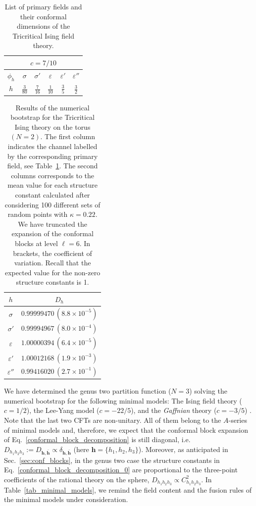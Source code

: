 \documentclass[a4paper,11pt]{article}
\begin{document}
\begin{table}[tbp]
\centering
\begin{tabular}{|c|c c c c c|}
\multicolumn{6}{c}{$c=7/10$}\\
\hline 
$\phi_h$ & $\sigma$ & $\sigma'$ & $\varepsilon$ & $\varepsilon'$ & $\varepsilon''$\\
\hline 
$h$ & $\frac{3}{80}$ & $\frac{7}{16}$ & $\frac{1}{10}$ & $\frac{3}{5}$ & $\frac{3}{2}$\\
\hline
\end{tabular}
\caption{\label{tab_tric} List of primary fields and their conformal dimensions of the 
Tricritical Ising field theory.}
\end{table}

\begin{table}[tbp]
\centering
\begin{tabular}{|c|c|}
\hline 
  $h$ &  $D_{h}$ \\ 
 \hline
 $\sigma$        &  $0.99999470\,(8.8\times 10^{-5})$  \\
 $\sigma'$       &  $0.99994967\,(8.0\times 10^{-4})$  \\
 $\varepsilon$   &  $1.00000394\,(6.4\times 10^{-5})$ \\
 $\varepsilon'$  &  $1.00012168\,(1.9\times 10^{-3})$  \\
 $\varepsilon''$ &  $0.99416020\,(2.7\times 10^{-1})$\\
 \hline
\end{tabular}
\caption{\label{tab_tric_results} Results of the numerical bootstrap for the Tricritical 
Ising theory on the torus $(N=2)$. The first column indicates the channel labelled by the
corresponding primary field, see Table~\ref{tab_tric}. The second columns corresponds to the mean value for 
each structure constant calculated after considering 100 different sets of random points with $\kappa=0.22$. 
We have truncated the expansion of the conformal blocks at level $\ell=6$. In brackets, the 
coefficient of variation. Recall that the expected value for the non-zero structure constants 
is 1.}
\end{table}



We have determined the genus two partition function ($N=3$)  solving the numerical bootstrap for the following  minimal models: The Ising field theory ($c=1/2$), the 
Lee-Yang model ($c=-22/5$), and the \textit{Gaffnian} theory 
($c=-3/5$) \cite{Simon,Ardonne}. Note that the last two CFTs are non-unitary. All of them 
belong to the $A$-series of minimal models and, therefore, we expect that the conformal block expansion of Eq.~\eqref{conformal_block_decomposition} is still diagonal, i.e. 
$D_{h_1h_2h_3}:=D_{\boldsymbol{h}, \boldsymbol{\bar{h}}}\propto 
\delta_{\boldsymbol{h}, \boldsymbol{\bar{h}}}$ (here $\boldsymbol{h}=\{h_1, h_2, h_3\}$). Moreover, as anticipated in Sec.~\ref{sec:conf_blocks}, 
in the genus two case the structure constants in Eq.~\eqref{conformal_block_decomposition_0} are proportional to the three-point coefficients of the rational theory on the sphere, 
$D_{h_1h_2h_3}\propto C_{h_1h_2h_3}^2$. In Table~\ref{tab_minimal_models}, we remind the 
field content and the fusion rules of the minimal models under consideration. 
\end{document}
